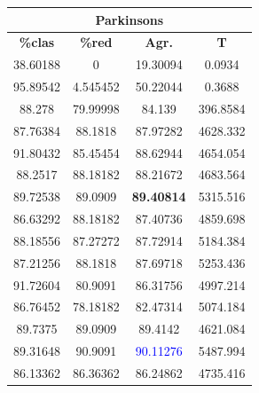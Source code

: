 \documentclass[11pt,a4paper]{article}
\theoremstyle{definition}
\begin{document}
\begin{tabbing}
{		\begin{tabular}{|c|c|c|c|}
			\hline
			\multicolumn{4}{|c|}{\textbf{Parkinsons}} \\ \hline
			\textbf{\%clas} & \textbf{\%red} & \textbf{Agr.} & \textbf{T} \\ \hline 
			38.60188	&0	        &19.30094	&0.0934\\ \hline
95.89542&	4.545452	&50.22044	&0.3688\\ \hline
88.278	 & 79.99998	&84.139	  &396.8584\\ \hline
87.76384 & 88.1818 & 87.97282 & 4628.332\\ \hline
91.80432 & 85.45454 & 88.62944 & 4654.054\\ \hline
88.2517 & 88.18182 & 88.21672 & 4683.564\\ \hline
89.72538 & 89.0909 & \textbf{89.40814} & 5315.516\\ \hline
86.63292 & 88.18182 & 87.40736 & 4859.698\\ \hline
88.18556 & 87.27272 & 87.72914 & 5184.384\\ \hline
87.21256 & 88.1818 & 87.69718 & 5253.436\\ \hline
91.72604 & 80.9091 & 86.31756 & 4997.214 \\ \hline
86.76452 & 78.18182 & 82.47314 & 5074.184 \\ \hline
89.7375 & 89.0909 & 89.4142 & 4621.084 \\ \hline
89.31648 & 90.9091 & \textcolor{blue}{90.11276} & 5487.994 \\ \hline
86.13362 & 86.36362 & 86.24862 & 4735.416 \\ \hline

		\end{tabular}
		
}
\end{tabbing}
\end{document}
